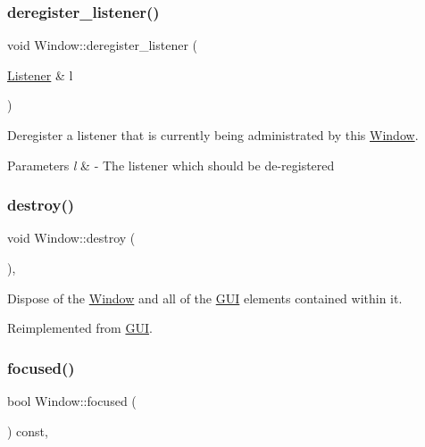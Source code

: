 \subsubsection{\texorpdfstring{deregister\+\_\+listener()}{deregister\_listener()}}
{\footnotesize\ttfamily void Window\+::deregister\+\_\+listener (\begin{DoxyParamCaption}\item[{\mbox{\hyperlink{class_listener}{Listener}} \&}]{l }\end{DoxyParamCaption})}

Deregister a listener that is currently being administrated by this \mbox{\hyperlink{class_window}{Window}}. 
\begin{DoxyParams}{Parameters}
{\em l} & -\/ The listener which should be de-\/registered \\
\hline
\end{DoxyParams}
\mbox{\label{class_window_ac11084e8bd2b61ba1a45266a9a4a0b57}} 
\subsubsection{\texorpdfstring{destroy()}{destroy()}}
{\footnotesize\ttfamily void Window\+::destroy (\begin{DoxyParamCaption}{ }\end{DoxyParamCaption})\hspace{0.3cm}{\ttfamily [override]}, {\ttfamily [virtual]}}

Dispose of the \mbox{\hyperlink{class_window}{Window}} and all of the \mbox{\hyperlink{class_g_u_i}{G\+UI}} elements contained within it. 

Reimplemented from \mbox{\hyperlink{class_g_u_i_a2abe7f08a1da35af8ae006fbecea94e0}{G\+UI}}.

\mbox{\label{class_window_af79c5fde03ed3825e0459a267ea01dee}} 
\subsubsection{\texorpdfstring{focused()}{focused()}}
{\footnotesize\ttfamily bool Window\+::focused (\begin{DoxyParamCaption}{ }\end{DoxyParamCaption}) const\hspace{0.3cm}{\ttfamily [override]}, {\ttfamily [virtual]}}

